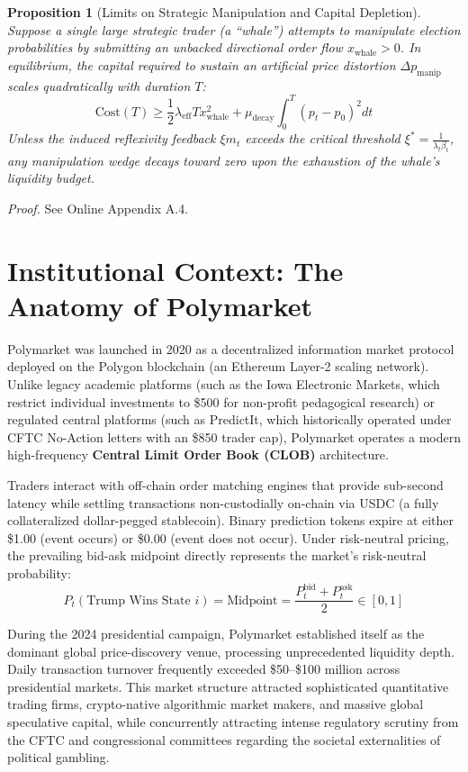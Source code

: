 \documentclass[12pt, a4paper]{article}
\newtheorem{proposition}{Proposition}
\begin{document}
\begin{proposition}[Limits on Strategic Manipulation and Capital Depletion]
\label{prop:whale}
Suppose a single large strategic trader (a ``whale'') attempts to manipulate election probabilities by submitting an unbacked directional order flow $x_{\text{whale}} > 0$. In equilibrium, the capital required to sustain an artificial price distortion $\Delta p_{\text{manip}}$ scales quadratically with duration $T$:
\begin{equation}
\text{Cost}(T) \ge \frac{1}{2} \lambda_{\text{eff}} T x_{\text{whale}}^2 + \mu_{\text{decay}} \int_0^T (p_t - p_0)^2 dt
\end{equation}
Unless the induced reflexivity feedback $\xi m_t$ exceeds the critical threshold $\xi^* = \frac{1}{\lambda_t \beta_t}$, any manipulation wedge decays toward zero upon the exhaustion of the whale's liquidity budget.
\end{proposition}
\noindent \textit{Proof.} See Online Appendix A.4.

\section{Institutional Context: The Anatomy of Polymarket}
\label{sec:institutional}

Polymarket was launched in 2020 as a decentralized information market protocol deployed on the Polygon blockchain (an Ethereum Layer-2 scaling network). Unlike legacy academic platforms (such as the Iowa Electronic Markets, which restrict individual investments to \$500 for non-profit pedagogical research) or regulated central platforms (such as PredictIt, which historically operated under CFTC No-Action letters with an \$850 trader cap), Polymarket operates a modern high-frequency \textbf{Central Limit Order Book (CLOB)} architecture.

Traders interact with off-chain order matching engines that provide sub-second latency while settling transactions non-custodially on-chain via USDC (a fully collateralized dollar-pegged stablecoin). Binary prediction tokens expire at either \$1.00 (event occurs) or \$0.00 (event does not occur). Under risk-neutral pricing, the prevailing bid-ask midpoint directly represents the market's risk-neutral probability:
\begin{equation}
P_t(\text{Trump Wins State } i) = \text{Midpoint} = \frac{P_t^{\text{bid}} + P_t^{\text{ask}}}{2} \in [0, 1]
\end{equation}

During the 2024 presidential campaign, Polymarket established itself as the dominant global price-discovery venue, processing unprecedented liquidity depth. Daily transaction turnover frequently exceeded \$50--\$100 million across presidential markets. This market structure attracted sophisticated quantitative trading firms, crypto-native algorithmic market makers, and massive global speculative capital, while concurrently attracting intense regulatory scrutiny from the CFTC and congressional committees regarding the societal externalities of political gambling.
\end{document}
